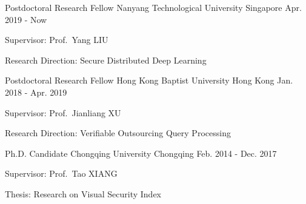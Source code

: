 

\begin{cventries}
    \cventry%
    {Postdoctoral Research Fellow}
    {Nanyang Technological University}
    {Singapore}
    {Apr. 2019 - Now} %
    {
        \begin{cvitems}
            \item{Supervisor: Prof.\ Yang LIU}
            \item{Research Direction: Secure Distributed Deep Learning}
        \end{cvitems}
    }
    \cventry%
    {Postdoctoral Research Fellow}
    {Hong Kong Baptist University}
    {Hong Kong}
    {Jan. 2018 - Apr. 2019} %
    {
        \begin{cvitems}
            \item{Supervisor: Prof.\ Jianliang XU}
            \item{Research Direction: Verifiable Outsourcing Query Processing}
        \end{cvitems}
    }
	\cventry%
	{Ph.D. Candidate}
	{Chongqing University}
	{Chongqing}
	{Feb. 2014 - Dec. 2017} %
	{
		\begin{cvitems}
			\item{Supervisor: Prof.\ Tao XIANG}
			\item{Thesis: Research on Visual Security Index}
		\end{cvitems}
	}
\end{cventries}
\vspace{-0.2cm}
